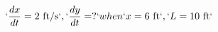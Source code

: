 \documentclass[preview]{standalone}
\begin{document}
\begin{align*}
`\frac{dx}{dt} = 2 \text{ ft/s}`, `\frac{dy}{dt} = ?` when `x = 6 \text{ ft}`, `L = 10 \text{ ft}`
\end{align*}
\end{document}

